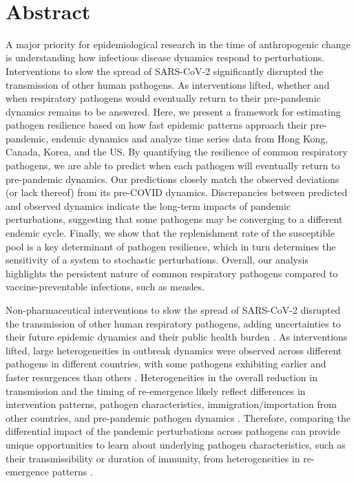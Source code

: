\documentclass[12pt]{article}
\date{\today}
\begin{document}
\begin{flushleft}{
	\Large
	\textbf{}
}
\newline
\\
\bigskip
\end{flushleft}

\section*{Abstract}

A major priority for epidemiological research in the time of anthropogenic change is understanding how infectious disease dynamics respond to perturbations.
Interventions to slow the spread of SARS-CoV-2 significantly disrupted the transmission of other human pathogens. 
As interventions lifted, whether and when respiratory pathogens would eventually return to their pre-pandemic dynamics remains to be answered.
Here, we present a framework for estimating pathogen resilience based on how fast epidemic patterns approach their pre-pandemic, endemic dynamics and analyze time series data from Hong Kong, Canada, Korea, and the US.
By quantifying the resilience of common respiratory pathogens, we are able to predict when each pathogen will eventually return to pre-pandemic dynamics.
Our predictions closely match the observed deviations (or lack thereof) from its pre-COVID dynamics.
Discrepancies between predicted and observed dynamics indicate the long-term impacts of pandemic perturbations, suggesting that some pathogens may be converging to a different endemic cycle.
Finally, we show that the replenishment rate of the susceptible pool is a key determinant of pathogen resilience, which in turn determines the sensitivity of a system to stochastic perturbations.
Overall, our analysis highlights the persistent nature of common respiratory pathogens compared to vaccine-preventable infections, such as measles.

\pagebreak

Non-pharmaceutical interventions to slow the spread of SARS-CoV-2 disrupted the transmission of other human respiratory pathogens, adding uncertainties to their future epidemic dynamics and their public health burden \citep{baker2020impact}.
As interventions lifted, large heterogeneities in outbreak dynamics were observed across different pathogens in different countries, with some pathogens exhibiting earlier and faster resurgences than others \citep{gomez2021uncertain,koltai2022determinants,park2024predicting}.
Heterogeneities in the overall reduction in transmission and the timing of re-emergence likely reflect differences in intervention patterns, pathogen characteristics, immigration/importation from other countries, and pre-pandemic pathogen dynamics \citep{perofsky2024impacts}.
Therefore, comparing the differential impact of the pandemic perturbations across pathogens can provide unique opportunities to learn about underlying pathogen characteristics, such as their transmissibility or duration of immunity, from heterogeneities in re-emergence patterns \citep{chow2023effects}.
\end{document}

